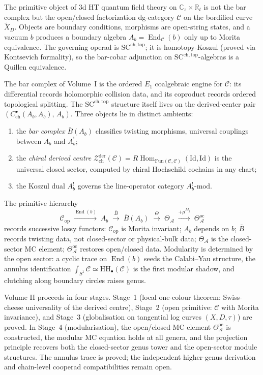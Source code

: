 \documentclass[11pt]{report}
\theoremstyle{definition}
\theoremstyle{remark}
\providecommand{\cA}{\mathcal{A}}
\providecommand{\cC}{\mathcal{C}}
\providecommand{\cZ}{\mathcal{Z}}
\providecommand{\barB}{\bar{B}}
\providecommand{\Fun}{\mathrm{Fun}}
\providecommand{\Id}{\mathrm{Id}}
\providecommand{\der}{\mathrm{der}}
\providecommand{\oc}{\mathrm{oc}}
\providecommand{\op}{\mathrm{op}}
\providecommand{\HH}{\mathrm{HH}}
\providecommand{\SCchtop}{\mathrm{SC}^{\mathrm{ch,top}}}
\providecommand{\bC}{\mathbb{C}}
\providecommand{\bR}{\mathbb{R}}
\providecommand{\ch}{\mathrm{ch}}
\DeclareMathOperator{\End}{End}
\DeclareMathOperator{\Hom}{Hom}
\numberwithin{equation}{section}
\begin{document}
The primitive object of 3d HT quantum field theory on
$\bC_z \times \bR_t$ is not the bar complex but the open/closed
factorization dg-category $\cC$ on the bordified curve
$\widetilde X_D$. Objects are boundary conditions, morphisms
are open-string states, and a vacuum $b$ produces a boundary
algebra $A_b = \End_\cC(b)$ only up to Morita equivalence. The
governing operad is $\SCchtop$; it is homotopy-Koszul (proved
via Kontsevich formality), so the bar-cobar adjunction on
$\SCchtop$-algebras is a Quillen equivalence.

The bar complex of Volume~I is the ordered $E_1$ coalgebraic
engine for $\cC$: its differential records holomorphic
collision data, and its coproduct records ordered topological
splitting. The $\SCchtop$ structure itself lives on the
derived-center pair
$(C^\bullet_{\mathrm{ch}}(A_b, A_b),\, A_b)$.
Three objects lie in distinct ambients:
\begin{enumerate}[label=\textup{(\roman*)},nosep]
\item the \emph{bar complex} $\barB(A_b)$ classifies twisting
morphisms, universal couplings between $A_b$ and $A_b^!$;
\item the \emph{chiral derived centre}
$\cZ^{\der}_{\ch}(\cC) =
R\Hom_{\Fun(\cC,\cC)}(\Id, \Id)$ is the universal closed sector,
computed by chiral Hochschild cochains in any chart;
\item the Koszul dual $A_b^!$ governs the line-operator
category $A_b^!\text{-mod}$.
\end{enumerate}
The primitive hierarchy
\[
\cC_{\op}
\;\xrightarrow{\End(b)}\;
A_b
\;\xrightarrow{\barB}\;
\barB(A_b)
\;\xrightarrow{\Theta}\;
\Theta_\cA
\;\xrightarrow{+\mu^{M_j}}\;
\Theta^{\oc}_\cA
\]
records successive lossy functors: $\cC_{\op}$ is Morita
invariant; $A_b$ depends on $b$; $\barB$ records twisting data,
not closed-sector or physical-bulk data; $\Theta_\cA$ is the
closed-sector MC element;
$\Theta^{\oc}_\cA$ restores open/closed data. Modularity is
determined by the open sector: a cyclic trace on $\End(b)$
seeds the Calabi--Yau structure, the annulus identification
$\int_{S^1} \cC \simeq \HH_\bullet(\cC)$ is the first modular
shadow, and clutching along boundary circles raises genus.

Volume II proceeds in four stages. Stage~1 (local one-colour
theorem: Swiss-cheese universality of the derived centre),
Stage~2 (open primitive: $\cC$ with Morita invariance), and
Stage~3 (globalisation on tangential log curves $(X, D, \tau)$)
are proved. In Stage~4 (modularisation), the open/closed MC
element $\Theta^{\oc}_\cA$ is constructed, the modular MC
equation holds at all genera, and the projection principle
recovers both the closed-sector genus tower and the
open-sector module structures. The annulus trace is proved;
the independent higher-genus derivation and chain-level
cooperad compatibilities remain open.
\end{document}
